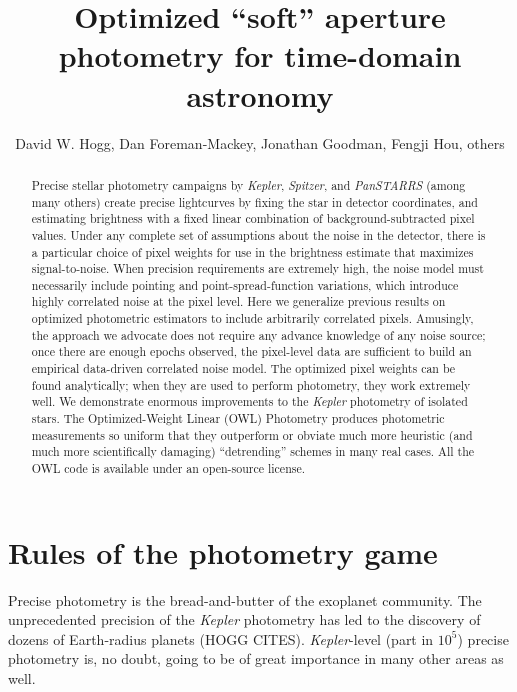 \documentclass[12pt, letterpaper, preprint]{aastex}
\newcommand{\project}[1]{\textsl{#1}}
\begin{document}
\title{
  Optimized ``soft'' aperture photometry for time-domain astronomy
}
\author{
  David W. Hogg,
  Dan Foreman-Mackey,
  Jonathan Goodman,
  Fengji Hou,
  others
}

\begin{abstract}
Precise stellar photometry campaigns by \project{Kepler}, \project{Spitzer}, and \project{PanSTARRS}
  (among many others)
  create precise lightcurves by fixing the star in detector coordinates,
  and estimating brightness with a fixed linear combination of background-subtracted pixel values.
Under any complete set of assumptions about the noise in the detector,
  there is a particular choice of pixel weights for use in the brightness estimate
  that maximizes signal-to-noise.
When precision requirements are extremely high,
  the noise model must necessarily include pointing and point-spread-function variations,
  which introduce highly correlated noise at the pixel level.
Here we generalize previous results on optimized photometric estimators
  to include arbitrarily correlated pixels.
Amusingly, the approach we advocate does not require any advance knowledge of any noise source;
  once there are enough epochs observed,
  the pixel-level data are sufficient to build an empirical data-driven correlated noise model.
The optimized pixel weights can be found analytically;
  when they are used to perform photometry, they work extremely well.
We demonstrate enormous improvements to the \project{Kepler} photometry of isolated stars.
The Optimized-Weight Linear (OWL) Photometry produces photometric measurements so uniform that
  they outperform or obviate much more heuristic (and much more scientifically damaging)
  ``detrending'' schemes in many real cases.
All the OWL code is available under an open-source license.
\end{abstract}


\section{Rules of the photometry game}

Precise photometry is the bread-and-butter of the exoplanet community.
The unprecedented precision of the \project{Kepler} photometry has led to the discovery of
dozens of Earth-radius planets (HOGG CITES).
\project{Kepler}-level (part in $10^5$) precise photometry is, no doubt,
  going to be of great importance in many other areas as well.
\end{document}
